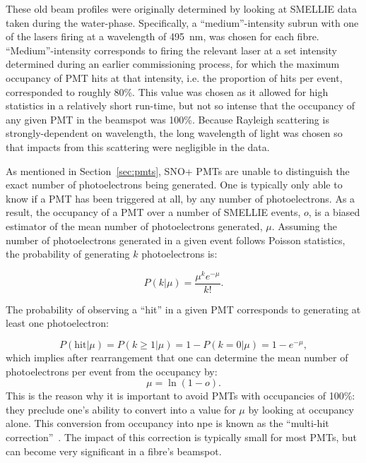 These old beam profiles were originally determined by looking at SMELLIE data taken during the water-phase. Specifically, a ``medium''-intensity subrun with one of the lasers firing at a wavelength of \SI{495}{\nano\metre}, was chosen for each fibre. ``Medium''-intensity corresponds to firing the relevant laser at a set intensity determined during an earlier commissioning process, for which the maximum occupancy of PMT hits at that intensity, i.e. the proportion of hits per event, corresponded to roughly 80\%. This value was chosen as it allowed for high statistics in a relatively short run-time, but not so intense that the occupancy of any given PMT in the beamspot was 100\%. Because Rayleigh scattering is strongly-dependent on wavelength, the long wavelength of light was chosen so that impacts from this scattering were negligible in the data.

As mentioned in Section~\ref{sec:pmts}, SNO+ PMTs are unable to distinguish the exact number of photoelectrons being generated. One is typically only able to know if a PMT has been triggered at all, by any number of photoelectrons. As a result, the occupancy of a PMT over a number of SMELLIE events, $o$, is a biased estimator of the mean number of photoelectrons generated, $\mu$. Assuming the number of photoelectrons generated in a given event follows Poisson statistics, the probability of generating $k$ photoelectrons is:

\begin{equation}
    P\left(k | \mu\right) = \frac{\mu^{k}e^{-\mu}}{k!}.
\end{equation}

The probability of observing a ``hit'' in a given PMT corresponds to generating at least one photoelectron:

\begin{equation}\label{eq:p_hit}
    P\left(\text{hit}| \mu\right) = P\left(k\geq 1 | \mu\right) = 1 - P\left(k = 0 | \mu\right) = 1 - e^{-\mu},
\end{equation}
which implies after rearrangement that one can determine the mean number of photoelectrons per event from the occupancy by:
\begin{equation}\label{eq:multihit_correction}
    \mu = \ln\left(1 - o\right).
\end{equation}
This is the reason why it is important to avoid PMTs with occupancies of 100\%: they preclude one's ability to convert into a value for $\mu$ by looking at occupancy alone. This conversion from occupancy into npe is known as the ``multi-hit correction''~\cite{dungerOccupancyAnalysisMultipleHit2016}. The impact of this correction is typically small for most PMTs, but can become very significant in a fibre's beamspot.

